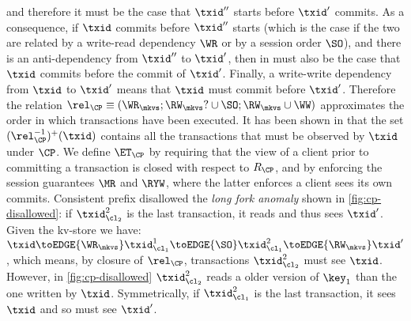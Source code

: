 and therefore it {must} be the case that $\txid''$ starts before 
$\txid'$ commits. 
As a consequence, if $\txid$ commits before $\txid''$ starts (which is the case if the two are 
related by a write-read dependency \(\WR\) or by a session order \(\SO\)), and there is an anti-dependency 
from $\txid''$ to $\txid'$, then in {must} also be the case that $\txid$ commits before 
the commit of $\txid'$.
Finally, a write-write dependency from $\txid$ to $\txid'$ means that $\txid$ {must} commit before $\txid'$. 
Therefore the relation $\rel_{\CP} \equiv (\WR_{\mkvs}; \RW_{\mkvs}? \cup \SO;  \RW_{\mkvs} \cup \WW)$ 
approximates the order in which transactions have been executed. It has been shown in \cite{laws} 
that the set $(\rel_{\CP}^{-1})^{+}(\txid)$ contains all the transactions that {must} be observed by $\txid$ under 
$\CP$. We define $\ET_{\CP}$ by requiring that the view of a client prior to committing a transaction is 
closed with respect to $R_{\CP}$, and by enforcing the session guarantees $\MR$ and $\RYW$,
where the latter enforces a client sees its own commits.
Consistent prefix disallowed the \emph{long fork anomaly} shown in \cref{fig:cp-disallowed}:
if \( \txid_{\cl_2}^2\) is the last transaction, it reads and thus sees \( \txid' \).
Given the kv-store we have:
\(
\txid \toEDGE{\WR_\mkvs} \txid^1_{\cl_1} \toEDGE{\SO} \txid^2_{\cl_1} \toEDGE{\RW_\mkvs} \txid'
\),
which means, by closure of \( \rel_{\CP} \), transactions \( \txid_{\cl_2}^2 \) must see \( \txid \).
However, in \cref{fig:cp-disallowed} \( \txid_{\cl_2}^2 \) reads a older version of \( \key_1 \) than the one written by \( \txid \).
Symmetrically,
if \( \txid_{\cl_1}^2\) is the last transaction, it sees \( \txid \) and so must see \( \txid' \).


